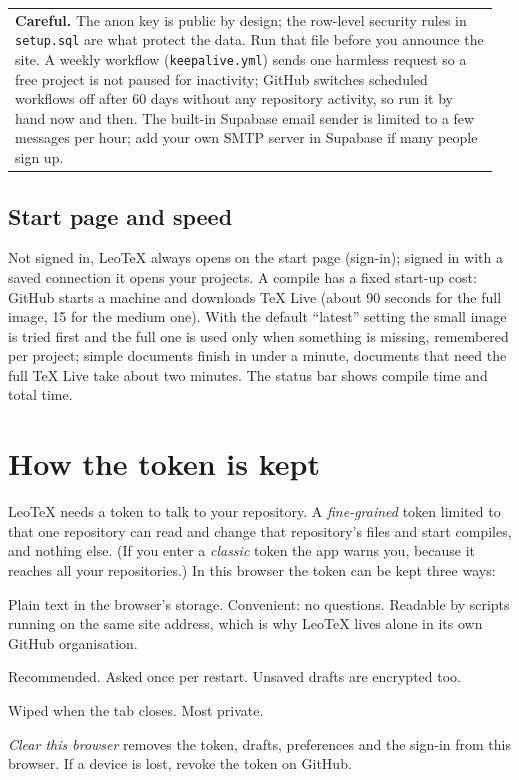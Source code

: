 \documentclass[11pt,a4paper]{article}
\newcommand{\leotex}{Leo\TeX{}}
\newcommand{\fpath}[1]{\texttt{\small #1}}
\newenvironment{caution}{\par\medskip\noindent\begin{tabular}{|p{0.955\linewidth}}\color{warn}\textbf{Careful.} }{\end{tabular}\par\medskip}
\begin{document}
\begin{caution}The anon key is public by design; the row-level security rules in \fpath{setup.sql} are what protect the data. Run that file before you
announce the site. A weekly workflow (\fpath{keepalive.yml}) sends one harmless request so a free project is not paused for inactivity; GitHub switches scheduled
workflows off after 60 days without any repository activity, so run it by hand now and then. The built-in Supabase email sender is limited to a few
messages per hour; add your own SMTP server in Supabase if many people sign up.\end{caution}

\subsection{Start page and speed}
Not signed in, \leotex{} always opens on the start page (sign-in); signed in with a saved connection it opens your projects.
A compile has a fixed start-up cost: GitHub starts a machine and downloads \TeX{} Live (about 90 seconds for the full image, 15 for the medium one). With the default ``latest'' setting the small image is tried first and the full one is used only when something is missing, remembered per project; simple documents finish in under a minute, documents that need the full \TeX{} Live take about two minutes. The status bar shows compile time and total time.

\section{How the token is kept}
\label{sec:token}
\leotex{} needs a token to talk to your repository. A \emph{fine-grained} token limited to that one repository can read and change that repository's files and start compiles,
and nothing else. (If you enter a \emph{classic} token the app warns you, because it reaches all your repositories.) In this browser the token can be kept three ways:
\begin{description}[leftmargin=3.2cm,style=nextline]
  \item[On this device] Plain text in the browser's storage. Convenient: no questions. Readable by scripts running on the same site address, which is why \leotex{} lives alone in its
        own GitHub organisation.
  \item[Encrypted with a passphrase] Recommended. Asked once per restart. Unsaved drafts are encrypted too.
  \item[Only until the tab closes] Wiped when the tab closes. Most private.
\end{description}
\emph{Clear this browser} removes the token, drafts, preferences and the sign-in from this browser. If a device is lost, revoke the token on GitHub.
\end{document}
